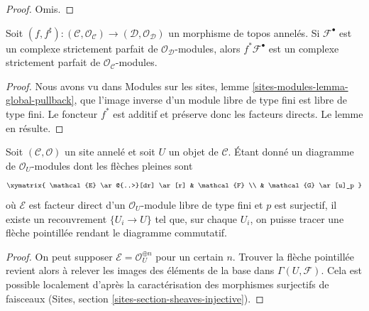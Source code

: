 \begin{proof}
Omis.
\end{proof}

\begin{lemma}
\label{lemma-strictly-perfect-pullback}
Soit $(f, f^\sharp) : (\mathcal{C}, \mathcal{O}_\mathcal{C}) \to
(\mathcal{D}, \mathcal{O}_\mathcal{D})$
un morphisme de topos annelés. Si $\mathcal{F}^\bullet$ est un complexe
strictement parfait de $\mathcal{O}_\mathcal{D}$-modules, alors
$f^*\mathcal{F}^\bullet$ est un complexe strictement parfait de
$\mathcal{O}_\mathcal{C}$-modules.
\end{lemma}

\begin{proof}
Nous avons vu dans Modules sur les sites, lemme
\ref{sites-modules-lemma-global-pullback}, que l'image inverse d'un module
libre de type fini est libre de type fini. Le foncteur $f^*$ est additif et
préserve donc les facteurs directs. Le lemme en résulte.
\end{proof}

\begin{lemma}
\label{lemma-local-lift-map}
Soit $(\mathcal{C}, \mathcal{O})$ un site annelé et soit $U$ un objet de
$\mathcal{C}$. Étant donné un diagramme de $\mathcal{O}_U$-modules dont les
flèches pleines sont
$$
\xymatrix{
\mathcal{E} \ar@{..>}[dr] \ar[r] & \mathcal{F} \\
& \mathcal{G} \ar[u]_p
}
$$
où $\mathcal{E}$ est facteur direct d'un $\mathcal{O}_U$-module libre de type
fini et $p$ est surjectif, il existe un recouvrement $\{U_i \to U\}$ tel que,
sur chaque $U_i$, on puisse tracer une flèche pointillée rendant le diagramme
commutatif.
\end{lemma}

\begin{proof}
On peut supposer $\mathcal{E} = \mathcal{O}_U^{\oplus n}$ pour un certain $n$.
Trouver la flèche pointillée revient alors à relever les images des éléments
de la base dans $\Gamma(U, \mathcal{F})$. Cela est possible localement d'après
la caractérisation des morphismes surjectifs de faisceaux (Sites, section
\ref{sites-section-sheaves-injective}).
\end{proof}

